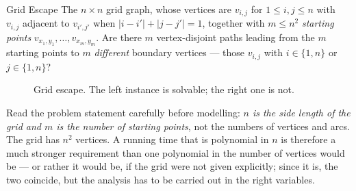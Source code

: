 \begin{probdef}{Grid Escape}
  \instance The $n \times n$ grid graph, whose vertices are $v_{i,j}$ for
  $1 \le i,j \le n$ with $v_{i,j}$ adjacent to $v_{i',j'}$ when
  $|i-i'| + |j-j'| = 1$, together with $m \le n^2$ \emph{starting points}
  $v_{x_1,y_1}, \ldots, v_{x_m,y_m}$.
  \question Are there $m$ vertex-disjoint paths leading from the $m$ starting
  points to $m$ \emph{different} boundary vertices --- those $v_{i,j}$ with
  $i \in \{1,n\}$ or $j \in \{1,n\}$?
\end{probdef}

\begin{figure}[ht]
\centering
{}
\caption{Grid escape. The left instance is solvable; the right one is not.}
\label{fig:flow-grid-escape}
\end{figure}

Read the problem statement carefully before modelling: \emph{$n$ is the side
length of the grid and $m$ is the number of starting points}, not the numbers
of vertices and arcs. The grid has $n^2$ vertices. A running time that is
polynomial in $n$ is therefore a much stronger requirement than one polynomial
in the number of vertices would be --- or rather it would be, if the grid were
not given explicitly; since it is, the two coincide, but the analysis has to be
carried out in the right variables.

